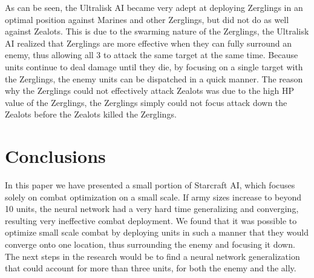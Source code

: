 \documentclass[twocolumn]{article}
\begin{document}
As can be seen, the Ultralisk AI became very adept at deploying Zerglings in an optimal position against Marines and other Zerglings, but did not do as well against Zealots. This is due to the swarming nature of the Zerglings, the Ultralisk AI realized that Zerglings are more effective when they can fully surround an enemy, thus allowing all 3 to attack the same target at the same time. Because units continue to deal damage until they die, by focusing on a single target with the Zerglings, the enemy units can be dispatched in a quick manner. The reason why the Zerglings could not effectively attack Zealots was due to the high HP value of the Zerglings, the Zerglings simply could not focus attack down the Zealots before the Zealots killed the Zerglings. 
\section{Conclusions}
In this paper we have presented a small portion of Starcraft AI, which focuses solely on combat optimization on a small scale. If army sizes increase to beyond 10 units, the neural network had a very hard time generalizing and converging, resulting very ineffective combat deployment. We found that it was possible to optimize small scale combat by deploying units in such a manner that they would converge onto one location, thus surrounding the enemy and focusing it down. The next steps in the research would be to find a neural network generalization that could account for more than three units, for both the enemy and the ally. 
\end{document}
